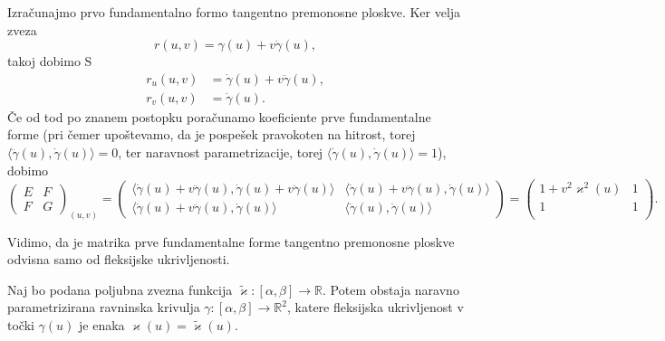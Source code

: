 Izračunajmo prvo fundamentalno formo tangentno premonosne ploskve. Ker velja zveza
\begin{equation*} r(u,v) = \gamma(u) + v \dot{\gamma}(u),\end{equation*}takoj dobimo S\begin{align*}
    r_u(u,v) &= \dot{\gamma}(u) + v \ddot{\gamma}(u), \\
    r_v(u,v) &= \dot{\gamma}(u). 
\end{align*}
Če od tod po znanem postopku poračunamo koeficiente prve fundamentalne forme (pri čemer upoštevamo, da je pospešek pravokoten na hitrost, torej $ \langle \ddot{\gamma}(u) , \dot{\gamma}(u) \rangle = 0$, ter naravnost parametrizacije, torej $ \langle \dot{\gamma}(u) , \dot{\gamma}(u) \rangle = 1$), dobimo 
\begin{equation*} \begin{pmatrix}
E & F \\
F & G
\end{pmatrix}_{(u,v)} = \begin{pmatrix}
  \langle \dot{\gamma}(u) + v \ddot{\gamma}(u), \dot{\gamma}(u) + v \ddot{\gamma}(u) \rangle  & \langle \dot{\gamma}(u) + v \ddot{\gamma}(u), \dot{\gamma}(u) \rangle \\
  \langle \dot{\gamma}(u) + v \ddot{\gamma}(u), \dot{\gamma}(u) \rangle & \langle \dot{\gamma}(u), \dot{\gamma}(u) \rangle
  \end{pmatrix}= \begin{pmatrix}
  1 + v^2 \varkappa^2(u) & 1\\
  1 & 1\\
\end{pmatrix}.\end{equation*}

Vidimo, da je matrika prve fundamentalne forme tangentno premonosne ploskve odvisna samo od fleksijske ukrivljenosti.

\begin{trditev}
\label{trd_obstoj_krivulje_glede_na_funkcijo_fleksijske_ukrivljenosti}
 Naj bo podana poljubna zvezna funkcija $\tilde{\varkappa}: [\alpha, \beta] \to  \mathbb{R}$. Potem obstaja naravno parametrizirana ravninska krivulja $\gamma: [\alpha, \beta] \to  \mathbb{R}^2$, katere fleksijska ukrivljenost v točki
  $\gamma(u)$ je enaka $\varkappa(u) = \tilde{\varkappa}(u)$.
\end{trditev}

